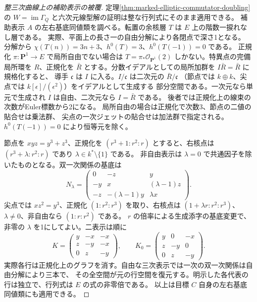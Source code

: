 \begin{proof}[整三次曲線上の補助表示の被覆]
定理\ref{thm:marked-elliptic-commutator-doubling}の
$W=\operatorname{im}\Gamma_Q$ と六次元線型解の証明は整な行列式にそのまま適用できる。
補助表示 $A$ の左右基底同値類を調べる。転置の余核層 $T$ は $E$ 上の階数一捩れなし層である。
実際、平面上の長さ一の自由分解により各閉点で深さ1となる。
分解から $\chi(T(n))=3n+3$、$h^0(T)=3$、$h^0(T(-1))=0$ である。
正規化 $\pi:\mathbf P^1\to E$ で局所自由でない場合は
$T=\pi_*\mathcal O_{\mathbf P^1}(2)$ しかない。特異点の完備局所環を $R$、正規化を
$\bar R$ とする。分数イデアルとしての局所加群を $I\bar R=\bar R$ に規格化すると、
導手 $\mathfrak c$ は $I$ に入る。$I/\mathfrak c$ は二次元の $\bar R/\mathfrak c$
（節点では $k\oplus k$、尖点では $k[\epsilon]/(\epsilon^2)$）をイデアルとして生成する
部分空間である。一次元なら単元で生成され $I$ は自由、二次元なら $I=\bar R$ である。
後者では正規化上の線束の次数がEuler標数から2になる。
局所自由の場合は正規化で次数3、節点の二値の貼合せは乗法群、
尖点の一次ジェットの貼合せは加法群で指定される。$h^0(T(-1))=0$ により恒等元を除く。

節点を $xyz=y^3+z^3$、正規化を $(r^3+1:r^2:r)$ とすると、右核点は
$(r^3+\lambda:r^2:r)$ であり $\lambda\in k^*\setminus\{1\}$ である。
非自由表示は $\lambda=0$ で共通因子を除いたものとなる。双一次関係の基底は
\[
 N_\lambda=\begin{pmatrix}0&-z&y\\-y&x&(\lambda-1)z\\
 -z&-(\lambda-1)y&\lambda x\end{pmatrix}.
\]
尖点では $xz^2=y^3$、正規化 $(1:r^2:r^3)$ を取り、右核点は
$(1+\lambda r:r^2:r^3)$、$\lambda\ne0$、非自由なら $(1:r:r^2)$ である。
$r$ の倍率による生成添字の基底変更で、非零の $\lambda$ を1にしてよい。二表示は順に
\[
 K=\begin{pmatrix}y&-x&-x\\z&-y&-x\\0&z&-y\end{pmatrix},\qquad
 K_0=\begin{pmatrix}y&0&-x\\z&-y&0\\0&z&-y\end{pmatrix}.
\]
実際各行は正規化上のグラフを消す。自由な三次表示では一次の双一次関係は自由分解により三本で、
その全空間が元の行空間を復元する。明示した各代表の行は独立で、行列式は $E$ の式の非零倍である。
以上は目標 $C$ 自身の左右基底同値類にも適用できる。
\end{proof}

